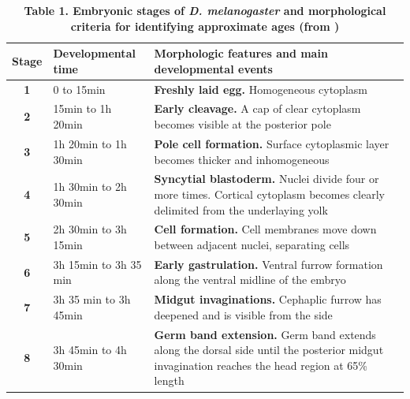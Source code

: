 \label{Table_droso}
\begin{table}
    \centering
\caption*{\textbf{Table 1. Embryonic stages of \textit{D. melanogaster} and morphological criteria for identifying approximate ages (from \citealp{Roberts1998}) }}
\begin{tabular}{|c|p{3.5cm}|p{14cm}|}
\hline
\textbf{Stage}&\textbf{Developmental time}&\textbf{Morphologic features and main developmental events}\\
\hline
\textbf{1}	& 0 to 15min	& \textbf{Freshly laid egg.} Homogeneous cytoplasm	\\
%
\textbf{2}	& 15min to 1h 20min	&  \textbf{Early cleavage.} A cap of clear cytoplasm becomes visible at the posterior pole 	\\  
%
\textbf{3}	& 1h 20min to 1h 30min	&  \textbf{Pole cell formation.} Surface cytoplasmic layer becomes thicker and inhomogeneous	\\  
%
\textbf{4}	& 1h 30min to 2h 30min & \textbf{Syncytial blastoderm.} Nuclei divide four or more times. Cortical cytoplasm  becomes clearly delimited	from the underlaying yolk\\
%
\textbf{5}	& 2h 30min to 3h 15min	& \textbf{Cell formation.} Cell membranes move down between adjacent nuclei, separating cells	\\
%
\textbf{6}	& 3h 15min to 3h 35 min	&  \textbf{Early gastrulation.} Ventral furrow formation along the ventral midline of the embryo \\
%
\textbf{7}	& 3h 35 min to 3h 45min	&  \textbf{Midgut invaginations.} Cephaplic furrow has deepened and is visible from the side	\\
%
\textbf{8}	& 3h 45min to 4h 30min	&  \textbf{Germ band extension.} Germ band extends along the dorsal side until the posterior midgut invagination reaches the head region at 65\% length	\\

\end{tabular}
\end{table}
